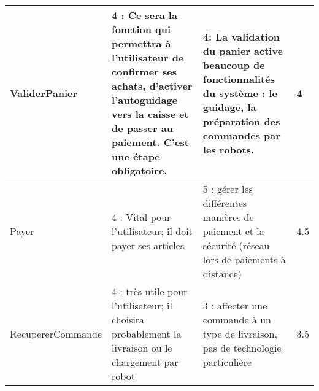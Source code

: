 \begin{longtable}{|R{5cm}|C{4cm}|L{4cm}|L{1cm}}
	 \hline
	 ValiderPanier & 4 : Ce sera la fonction qui permettra à l’utilisateur de confirmer ses achats, d’activer l’autoguidage vers la caisse et de passer au paiement. C’est une étape obligatoire. & 4: La validation du panier active beaucoup de fonctionnalités du système : le guidage, la préparation des commandes par les robots. & 4\\
	 \hline
	 Payer & 4 : Vital pour l’utilisateur; il doit payer ses articles & 5 : gérer les différentes manières de paiement et la sécurité (réseau lors de paiements à distance) & 4.5\\
	 \hline
	 RecupererCommande & 4 : très utile pour l’utilisateur; il choisira probablement la livraison ou le chargement par robot & 3 : affecter une commande à un type de livraison, pas de technologie particulière & 3.5\\
  	\hline
\end{longtable}